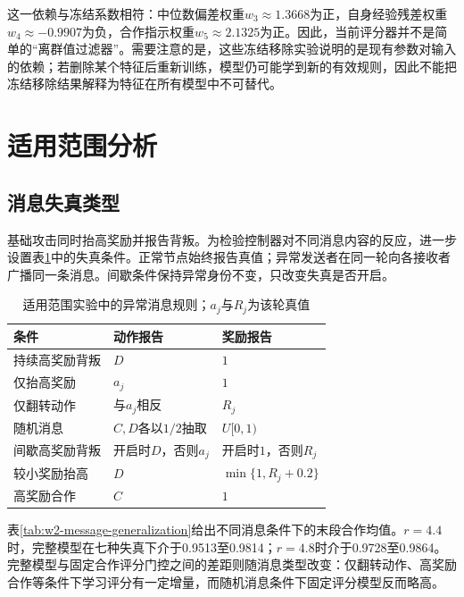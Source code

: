 

这一依赖与冻结系数相符：中位数偏差权重$w_3\approx1.3668$为正，自身经验残差权重$w_4\approx-0.9907$为负，合作指示权重$w_5\approx2.1325$为正。因此，当前评分器并不是简单的“离群值过滤器”。需要注意的是，这些冻结移除实验说明的是现有参数对输入的依赖；若删除某个特征后重新训练，模型仍可能学到新的有效规则，因此不能把冻结移除结果解释为特征在所有模型中不可替代。

\section{适用范围分析}
\subsection{消息失真类型}

基础攻击同时抬高奖励并报告背叛。为检验控制器对不同消息内容的反应，进一步设置表\ref{tab:w2-message-types}中的失真条件。正常节点始终报告真值；异常发送者在同一轮向各接收者广播同一条消息。间歇条件保持异常身份不变，只改变失真是否开启。

\begin{table}[!htbp]
\centering\small
\caption{适用范围实验中的异常消息规则；$a_j$与$R_j$为该轮真值}
\label{tab:w2-message-types}
\begin{tabular}{lll}
\toprule
条件 & 动作报告 & 奖励报告 \\
\midrule
持续高奖励背叛 & $D$ & $1$ \\
仅抬高奖励 & $a_j$ & $1$ \\
仅翻转动作 & 与$a_j$相反 & $R_j$ \\
随机消息 & $C,D$各以$1/2$抽取 & $U[0,1)$ \\
间歇高奖励背叛 & 开启时$D$，否则$a_j$ & 开启时$1$，否则$R_j$ \\
较小奖励抬高 & $D$ & $\min\{1,R_j+0.2\}$ \\
高奖励合作 & $C$ & $1$ \\
\bottomrule
\end{tabular}
\par{}
\end{table}

表\ref{tab:w2-message-generalization}给出不同消息条件下的末段合作均值。$r=4.4$时，完整模型在七种失真下介于0.9513至0.9814；$r=4.8$时介于0.9728至0.9864。完整模型与固定合作评分门控之间的差距则随消息类型改变：仅翻转动作、高奖励合作等条件下学习评分有一定增量，而随机消息条件下固定评分模型反而略高。

